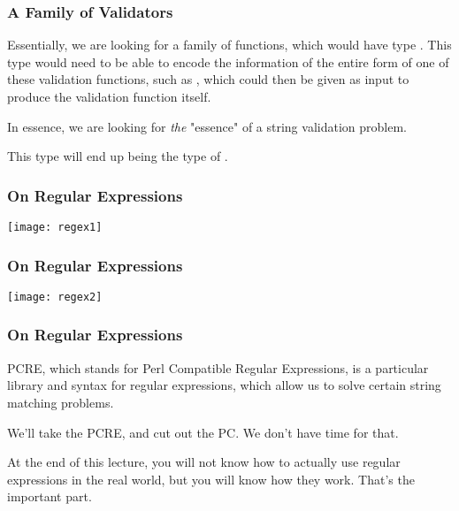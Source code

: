 \documentclass[aspectratio=169]{beamer}
\begin{document}
\begin{frame}[fragile]
  \frametitle{A Family of Validators}

  Essentially, we are looking for a family of functions, which would have
  type . This type  would need to be able
  to encode the information of the entire form of one of these validation functions,
  such as , which could then be given as input to produce the
  validation function itself.

  \pause
  \vspace{\fill}

  In essence, we are looking for \textit{the} "essence" of a string validation problem.

  \pause
  \vspace{\fill}

  This type  will end up being the type of .
\end{frame}


\begin{frame}[fragile]
  \frametitle{On Regular Expressions}

  \begin{center}
    \texttt{[image: regex1]}
  \end{center}
\end{frame}

\begin{frame}[fragile]
  \frametitle{On Regular Expressions}

  \begin{center}
    \texttt{[image: regex2]}\footnotemark
  \end{center}

\end{frame}

\begin{frame}[fragile]
  \frametitle{On Regular Expressions}

  PCRE, which stands for Perl Compatible Regular Expressions, is a particular
  library and syntax for regular expressions, which allow us to solve certain
  string matching problems.

  \pause
  \vspace{\fill}

  We'll take the PCRE, and cut out the PC. We don't have time for that.

  \pause
  \vspace{\fill}

  At the end of this lecture, you will not know how to actually use regular
  expressions in the real world, but you will know how they work. 
  That's the important part.
\end{frame}
\end{document}
